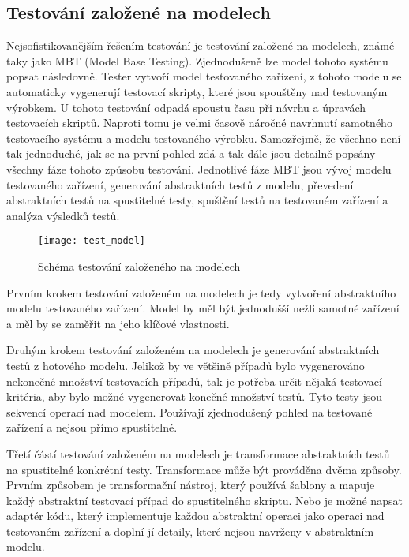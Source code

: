 \subsection{Testování založené na modelech}
Nejsofistikovanějším řešením testování je testování založené na modelech, známé taky jako MBT (Model Base Testing). Zjednodušeně lze model tohoto systému popsat následovně. Tester vytvoří model testovaného zařízení, z tohoto modelu se automaticky vygenerují testovací skripty, které jsou spouštěny nad testovaným výrobkem. U tohoto testování odpadá spoustu času při návrhu a úpravách testovacích skriptů. Naproti tomu je velmi časově náročné navrhnutí samotného testovacího systému a modelu testovaného výrobku. Samozřejmě, že všechno není tak jednoduché, jak se na první pohled zdá a tak dále jsou detailně popsány všechny fáze tohoto způsobu testování. Jednotlivé fáze MBT jsou vývoj modelu testovaného zařízení, generování abstraktních testů z modelu, převedení abstraktních testů na spustitelné testy, spuštění testů na testovaném zařízení a analýza výsledků testů.

\begin{figure}[h]
  \centering
  \texttt{[image: test\_model]}
  \caption{Schéma testování založeného na modelech}
  \label{fig:test_model}
\end{figure}

Prvním krokem testování založeném na modelech je tedy vytvoření abstraktního modelu testovaného zařízení. Model by měl být jednodušší nežli samotné zařízení a měl by se zaměřit na jeho klíčové vlastnosti.

Druhým krokem testování založeném na modelech je generování abstraktních testů z hotového modelu. Jelikož by ve většině případů bylo vygenerováno nekonečné množství testovacích případů, tak je potřeba určit nějaká testovací kritéria, aby bylo možné vygenerovat konečné množství testů. Tyto testy jsou sekvencí operací nad modelem. Používají zjednodušený pohled na testované zařízení a nejsou přímo spustitelné.

Třetí částí testování založeném na modelech je transformace abstraktních testů na spustitelné konkrétní testy. Transformace může být prováděna dvěma způsoby. Prvním způsobem je transformační nástroj, který používá šablony a mapuje každý abstraktní testovací případ do spustitelného skriptu. Nebo je možné napsat adaptér kódu, který implementuje každou abstraktní operaci jako operaci nad testovaném zařízení a doplní jí detaily, které nejsou navrženy v abstraktním modelu.


